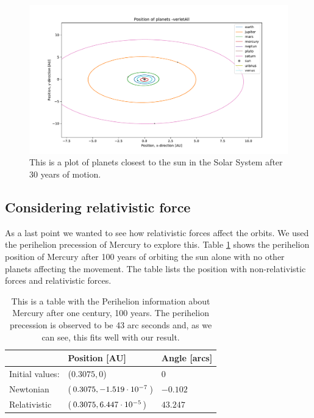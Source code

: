 \begin{figure}[H]
\includegraphics[width=1\linewidth]{../results/plots/innerplanets-verletAll.pdf}\caption{This is a plot of planets closest to the sun in the Solar System after 30 years of motion.}\label{fig:solarsystem_innerplanets}
\end{figure}
	
\subsection{Considering relativistic force}
	
As a last point we wanted to see how relativistic forces affect the orbits. We used the perihelion precession of Mercury to explore this. Table \ref{tab:Perihelion} shows the perihelion position of Mercury after 100 years of orbiting the sun alone with no other planets affecting the movement. The table lists the position with non-relativistic forces and relativistic forces.
	
\begin{table}[H]\caption{This is a table with the Perihelion information about Mercury after one century, 100 years. The perihelion precession is observed to be 43 arc seconds and, as we can see, this fits well with our result.}\label{tab:Perihelion}
  \begin{tabular}{lll} 
    & Position [AU] & Angle [arcs]\\ \hline 
    Initial values: &($0.3075,  0$)& $ 0$\\ 
    Newtonian &($0.3075,  -1.519\cdot 10^{-7} $)& $  -0.102 $\\ 
    Relativistic & ($ 0.3075, 6.447\cdot 10^{-5} $)  &$ 43.247 $ \\ 
\end{tabular}
\end{table}
